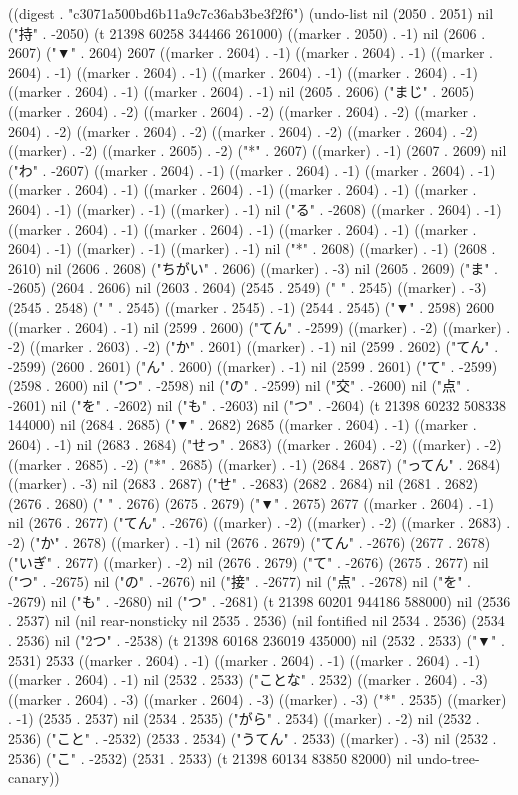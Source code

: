 
((digest . "c3071a500bd6b11a9c7c36ab3be3f2f6") (undo-list nil (2050 . 2051) nil ("持" . -2050) (t 21398 60258 344466 261000) ((marker . 2050) . -1) nil (2606 . 2607) ("▼" . 2604) 2607 ((marker . 2604) . -1) ((marker . 2604) . -1) ((marker . 2604) . -1) ((marker . 2604) . -1) ((marker . 2604) . -1) ((marker . 2604) . -1) ((marker . 2604) . -1) ((marker . 2604) . -1) nil (2605 . 2606) ("まじ" . 2605) ((marker . 2604) . -2) ((marker . 2604) . -2) ((marker . 2604) . -2) ((marker . 2604) . -2) ((marker . 2604) . -2) ((marker . 2604) . -2) ((marker . 2604) . -2) ((marker) . -2) ((marker . 2605) . -2) ("*" . 2607) ((marker) . -1) (2607 . 2609) nil ("わ" . -2607) ((marker . 2604) . -1) ((marker . 2604) . -1) ((marker . 2604) . -1) ((marker . 2604) . -1) ((marker . 2604) . -1) ((marker . 2604) . -1) ((marker . 2604) . -1) ((marker) . -1) ((marker) . -1) nil ("る" . -2608) ((marker . 2604) . -1) ((marker . 2604) . -1) ((marker . 2604) . -1) ((marker . 2604) . -1) ((marker . 2604) . -1) ((marker) . -1) ((marker) . -1) nil ("*" . 2608) ((marker) . -1) (2608 . 2610) nil (2606 . 2608) ("ちがい" . 2606) ((marker) . -3) nil (2605 . 2609) ("ま" . -2605) (2604 . 2606) nil (2603 . 2604) (2545 . 2549) ("   " . 2545) ((marker) . -3) (2545 . 2548) (" " . 2545) ((marker . 2545) . -1) (2544 . 2545) ("▼" . 2598) 2600 ((marker . 2604) . -1) nil (2599 . 2600) ("てん" . -2599) ((marker) . -2) ((marker) . -2) ((marker . 2603) . -2) ("か" . 2601) ((marker) . -1) nil (2599 . 2602) ("てん" . -2599) (2600 . 2601) ("ん" . 2600) ((marker) . -1) nil (2599 . 2601) ("て" . -2599) (2598 . 2600) nil ("つ" . -2598) nil ("の" . -2599) nil ("交" . -2600) nil ("点" . -2601) nil ("を" . -2602) nil ("も" . -2603) nil ("つ" . -2604) (t 21398 60232 508338 144000) nil (2684 . 2685) ("▼" . 2682) 2685 ((marker . 2604) . -1) ((marker . 2604) . -1) nil (2683 . 2684) ("せっ" . 2683) ((marker . 2604) . -2) ((marker) . -2) ((marker . 2685) . -2) ("*" . 2685) ((marker) . -1) (2684 . 2687) ("ってん" . 2684) ((marker) . -3) nil (2683 . 2687) ("せ" . -2683) (2682 . 2684) nil (2681 . 2682) (2676 . 2680) ("   " . 2676) (2675 . 2679) ("▼" . 2675) 2677 ((marker . 2604) . -1) nil (2676 . 2677) ("てん" . -2676) ((marker) . -2) ((marker) . -2) ((marker . 2683) . -2) ("か" . 2678) ((marker) . -1) nil (2676 . 2679) ("てん" . -2676) (2677 . 2678) ("いぎ" . 2677) ((marker) . -2) nil (2676 . 2679) ("て" . -2676) (2675 . 2677) nil ("つ" . -2675) nil ("の" . -2676) nil ("接" . -2677) nil ("点" . -2678) nil ("を" . -2679) nil ("も" . -2680) nil ("つ" . -2681) (t 21398 60201 944186 588000) nil (2536 . 2537) nil (nil rear-nonsticky nil 2535 . 2536) (nil fontified nil 2534 . 2536) (2534 . 2536) nil ("2つ" . -2538) (t 21398 60168 236019 435000) nil (2532 . 2533) ("▼" . 2531) 2533 ((marker . 2604) . -1) ((marker . 2604) . -1) ((marker . 2604) . -1) ((marker . 2604) . -1) nil (2532 . 2533) ("ことな" . 2532) ((marker . 2604) . -3) ((marker . 2604) . -3) ((marker . 2604) . -3) ((marker) . -3) ("*" . 2535) ((marker) . -1) (2535 . 2537) nil (2534 . 2535) ("がら" . 2534) ((marker) . -2) nil (2532 . 2536) ("こと" . -2532) (2533 . 2534) ("うてん" . 2533) ((marker) . -3) nil (2532 . 2536) ("こ" . -2532) (2531 . 2533) (t 21398 60134 83850 82000) nil undo-tree-canary))
